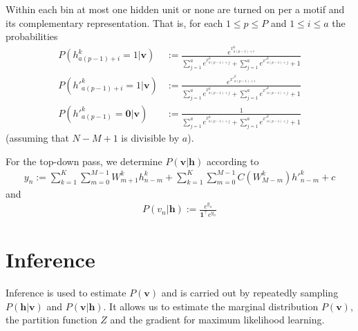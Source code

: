 \documentclass[12pt]{article}
\begin{document}
Within each bin at most one hidden unit or none 
 are turned on per a motif and its complementary representation.
That is, for each $1\leq p\leq P$ and $1\leq i\leq a$ the probabilities
\begin{align}
	P(h_{a(p-1)+i}^k=1|\mathbf{v})&:=\frac{e^{x_{a(p-1)+i}^k}}{\sum_{j=1}^a e^{x_{a(p-1)+j}^k}+ \sum_{j=1}^a e^{{x'}_{a(p-1)+j}^k}+1}\\
	P({h'}_{a(p-1)+i}^k=1|\mathbf{v})&:=\frac{e^{{x'}_{a(p-1)+i}^k}}{\sum_{j=1}^{a} e^{x_{a(p-1)+j}^k}+ \sum_{j=1}^a e^{{x'}_{a(p-1)+j}^k}+1}\\
	P({h'}_{a(p-1)}^k=\mathbf{0}|\mathbf{v})&:=\frac{1}{\sum_{j=1}^a e^{x_{a(p-1)+j}^k}+ \sum_{j=1}^a e^{{x'}_{a(p-1)+j}^k}+1}
\end{align}
(assuming that $N-M+1$ is divisible by $a$).\par
For the top-down pass, we determine $P(\mathbf{v}|\mathbf{h})$ according to
\begin{align}
	y_n:=\sum_{k=1}^K\sum_{m=0}^{M-1} W_{m+1}^k h_{n-m}^k + \sum_{k=1}^K\sum_{m=0}^{M-1} C(W_{M-m}^k) {h'}_{n-m}^k + c
\end{align}
and 
\begin{align}
	P(v_n|\mathbf{h}):=\frac{e^{y_n}}{\mathbf{1}^\top e^{y_n}}
\end{align}
\section{Inference}
Inference is used to estimate $P(\mathbf{v})$ and is carried out by repeatedly sampling
$P(\mathbf{h}|\mathbf{v})$ and $P(\mathbf{v}|\mathbf{h})$. It allows us to estimate the
marginal distribution $P(\mathbf{v})$, the partition function $Z$ and the gradient for 
maximum likelihood learning.
\end{document}
